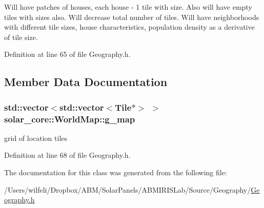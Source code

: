 Will have patches of houses, each house -\/ 1 tile with size. Also will have empty tiles with sizes also. Will decrease total number of tiles. Will have neighborhoods with different tile sizes, house characteristics, population density as a derivative of tile size. 

Definition at line 65 of file Geography.\+h.



\subsection{Member Data Documentation}
\hypertarget{classsolar__core_1_1_world_map_a2b94f74fcea57d3e01d8cab8348e1c48}{}
\subsubsection[{g\+\_\+map}]{\setlength{\rightskip}{0pt plus 5cm}std\+::vector$<$std\+::vector$<${\bf Tile}$\ast$$>$ $>$ solar\+\_\+core\+::\+World\+Map\+::g\+\_\+map}\label{classsolar__core_1_1_world_map_a2b94f74fcea57d3e01d8cab8348e1c48}
grid of location tiles 

Definition at line 68 of file Geography.\+h.



The documentation for this class was generated from the following file\+:\begin{DoxyCompactItemize}
\item 
/\+Users/wilfeli/\+Dropbox/\+A\+B\+M/\+Solar\+Panels/\+A\+B\+M\+I\+R\+I\+S\+Lab/\+Source/\+Geography/\hyperlink{_geography_8h}{Geography.\+h}\end{DoxyCompactItemize}

